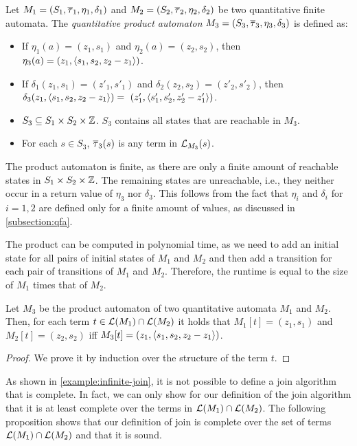 \begin{definition}
    Let $M_1 = (S_1, \overline{\tau}_1, \eta_1, \delta_1)$ and $M_2 = (S_2, \overline{\tau}_2, \eta_2, \delta_2)$ be two quantitative finite automata.
    The \emph{quantitative product automaton} $M_3 = (S_3, \overline{\tau}_3, \eta_3, \delta_3)$ is defined as:
    \begin{itemize}
        \item If $\eta_1(a) = (z_1, s_1)$ and $\eta_2(a) = (z_2, s_2)$, then
              $\eta_3(a) = (z_1, \langle s_1, s_2, z_2-z_1\rangle)$.
        \item If $\delta_1(z_1, s_1) = (z'_1, s'_1)$ and $\delta_2(z_2, s_2) = (z'_2, s'_2)$, then $\delta_3(z_1, \angl{s_1, s_2, z_2 - z_1}) =  (z'_1, \angl{s'_1, s'_2, z'_2 -z'_1})$.
        \item $S_3 \subseteq S_1 \times S_2 \times \mathbb{Z}$. $S_3$ contains all states that are reachable in $M_3$.
        \item For each $s \in S_3$, $\overline{\tau}_3(s)$ is any term in $\mathcal{L}_{M_3}(s)$.
    \end{itemize}
\end{definition}

The product automaton is finite, as there are only a finite amount of reachable states in $S_1 \times S_2 \times \mathbb{Z}$.
The remaining states are unreachable, i.e., they neither occur in a return value of $\eta_3$ nor $\delta_3$.
This follows from the fact that $\eta_i$ and $\delta_i$ for $i = 1,2$ are defined only for a finite amount of values, as discussed in \cref{subsection:qfa}.

The product can be computed in polynomial time, as we need to add an initial state for all pairs of initial states of $M_1$ and $M_2$ and then add a transition for each pair of transitions of $M_1$ and $M_2$. Therefore, the runtime is equal to the size of $M_1$ times that of $M_2$.

\begin{lemma}\label{lemma:join-automata}
    Let $M_3$ be the product automaton of two quantitative automata $M_1$ and $M_2$.
    Then, for each term $t \in \mathcal{L}(M_1) \cap \mathcal{L}(M_2)$ it holds that $M_1[t] = (z_1, s_1)$ and $M_2[t] = (z_2, s_2)$ iff $M_3[t] = (z_1, \langle s_1, s_2, z_2 - z_1\rangle)$.
\end{lemma}
\begin{proof}
    We prove it by induction over the structure of the term $t$.
\end{proof}

As shown in \cref{example:infinite-join}, it is not possible to define a join algorithm that is complete.
In fact, we can only show for our definition of the join algorithm that it is at least complete over the terms in $\mathcal{L}(M_1) \cap \mathcal{L}(M_2)$.
The following proposition shows that our definition of join is complete over the set of terms $\mathcal{L}(M_1) \cap \mathcal{L}(M_2)$ and that it is sound.

